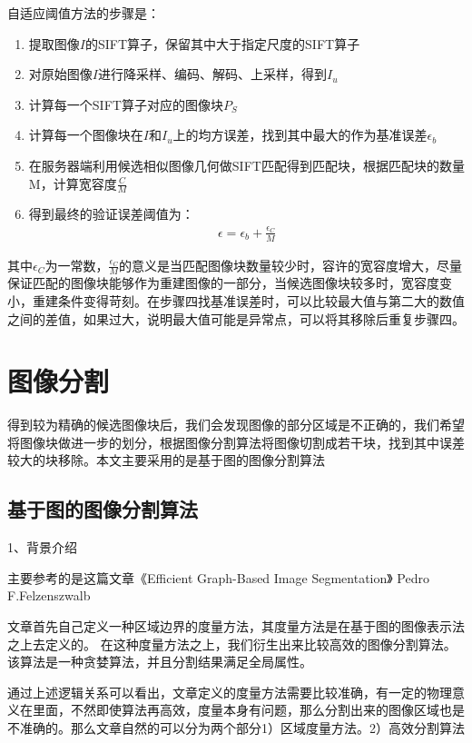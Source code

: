 自适应阈值方法的步骤是：
\begin{enumerate}
\item 提取图像\(I\)的SIFT算子，保留其中大于指定尺度的SIFT算子
\item 对原始图像\(I\)进行降采样、编码、解码、上采样，得到\(I_u\)
\item 计算每一个SIFT算子对应的图像块\(P_S\)
\item 计算每一个图像块在\(I\)和\(I_u\)上的均方误差，找到其中最大的作为基准误差\(\epsilon_b\)
\item 在服务器端利用候选相似图像几何做SIFT匹配得到匹配块，根据匹配块的数量M，计算宽容度\(\frac{C}{M}\)
\item 得到最终的验证误差阈值为：
\begin{align}
\epsilon = \epsilon_b + \frac{\epsilon_C}{M}
\end{align}
\end{enumerate}

其中\(\epsilon_C\)为一常数，\(\frac{\epsilon_C}{M}\)的意义是当匹配图像块数量较少时，容许的宽容度增大，尽量保证匹配的图像块能够作为重建图像的一部分，当候选图像块较多时，宽容度变小，重建条件变得苛刻。在步骤四找基准误差时，可以比较最大值与第二大的数值之间的差值，如果过大，说明最大值可能是异常点，可以将其移除后重复步骤四。

\section{图像分割}

得到较为精确的候选图像块后，我们会发现图像的部分区域是不正确的，我们希望将图像块做进一步的划分，根据图像分割算法将图像切割成若干块，找到其中误差较大的块移除。本文主要采用的是基于图的图像分割算法

\subsection{基于图的图像分割算法}

1、背景介绍

主要参考的是这篇文章《Efficient Graph-Based Image Segmentation》 Pedro F.Felzenszwalb

文章首先自己定义一种区域边界的度量方法，其度量方法是在基于图的图像表示法之上去定义的。
在这种度量方法之上，我们衍生出来比较高效的图像分割算法。该算法是一种贪婪算法，并且分割结果满足全局属性。

通过上述逻辑关系可以看出，文章定义的度量方法需要比较准确，有一定的物理意义在里面，不然即使算法再高效，度量本身有问题，那么分割出来的图像区域也是不准确的。那么文章自然的可以分为两个部分1）区域度量方法。2）高效分割算法

